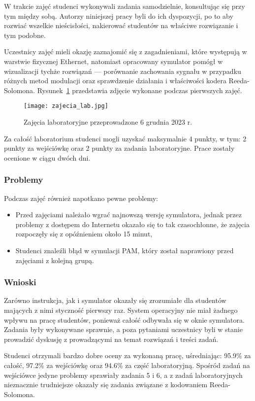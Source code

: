 W trakcie zajęć studenci wykonywali zadania samodzielnie, konsultując się przy tym między sobą. Autorzy niniejszej pracy
byli do ich dyspozycji, po to aby rozwiać wszelkie nieścisłości, nakierować studentów na właściwe rozwiązanie i tym podobne.

Uczestnicy zajęć mieli okazję zaznajomić się z zagadnieniami, które występują w warstwie fizycznej Ethernet, natomiast
opracowany symulator pomógł w wizualizacji tychże rozwiązań --- porównanie zachowania sygnału w przypadku różnych metod modulacji oraz
sprawdzenie działania i właściwości kodera Reeda-Solomona. Rysunek~\ref{fig:zajecia_lab_zdjecie} przedstawia zdjęcie wykonane podczas pierwszych zajęć.

\begin{figure}[H]
    \centering
    \texttt{[image: zajecia\_lab.jpg]}
    \caption{Zajęcia laboratoryjne przeprowadzone 6 grudnia 2023 r.}
    \label{fig:zajecia_lab_zdjecie}
\end{figure}

Za całość laboratorium studenci mogli uzyskać maksymalnie 4 punkty, w tym: 2 punkty za wejściówkę oraz 2 punkty za zadania laboratoryjne. Prace zostały ocenione w ciągu dwóch dni. 

\subsubsection{Problemy}
Podczas zajęć również napotkano pewne problemy:
\begin{itemize}
    \item Przed zajęciami należało wgrać najnowszą wersję symulatora, jednak przez problemy z dostępem do Internetu okazało się to tak czasochłonne, że zajęcia rozpoczęły się z opóźnieniem około 15 minut,
    \item Studenci znaleźli błąd w symulacji PAM, który został naprawiony przed zajęciami z kolejną grupą.
\end{itemize}

\subsubsection{Wnioski}
Zarówno instrukcja, jak i symulator okazały się zrozumiałe dla studentów mających z nimi styczność pierwszy raz. System operacyjny nie miał żadnego wpływu na pracę studentów, ponieważ całość odbywała się w oknie symulatora. Zadania były wykonywane sprawnie, a poza pytaniami uczestnicy byli w stanie prowadzić dyskusję z prowadzącymi na temat rozwiązań i treści zadań.

Studenci otrzymali bardzo dobre oceny za wykonaną pracę, uśredniając: 95.9\% za całość, 97.2\% za wejściówkę oraz 94.6\% za część laboratoryjną. Spośród zadań na wejściówce jedyne problemy sprawiały zadania 5 i 6, a z zadań laboratoryjnych nieznacznie trudniejsze okazały się zadania związane z kodowaniem Reeda-Solomona.